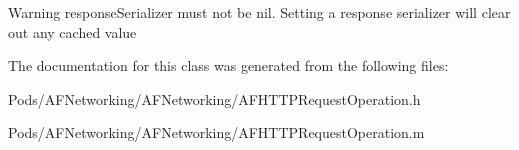 \begin{DoxyWarning}{Warning}
{\ttfamily response\+Serializer} must not be {\ttfamily nil}. Setting a response serializer will clear out any cached value 
\end{DoxyWarning}


The documentation for this class was generated from the following files\+:\begin{DoxyCompactItemize}
\item 
Pods/\+A\+F\+Networking/\+A\+F\+Networking/A\+F\+H\+T\+T\+P\+Request\+Operation.\+h\item 
Pods/\+A\+F\+Networking/\+A\+F\+Networking/A\+F\+H\+T\+T\+P\+Request\+Operation.\+m\end{DoxyCompactItemize}
